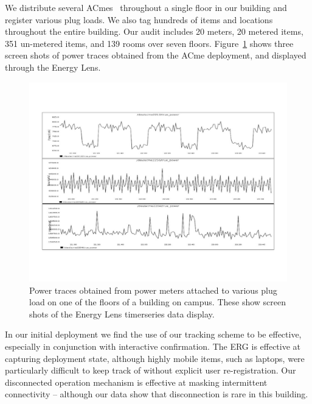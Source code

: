 We distribute several ACmes~\cite{acme} throughout a single floor in our building and register various plug loads.  We also tag
hundreds of items and locations throughout the entire building.  Our audit includes 20 meters, 20 metered items, 351 un-metered items,
 and 139 rooms over seven floors.  Figure~\ref{fig:tsdata} shows three screen shots of power traces obtained from the ACme deployment, and displayed
 through the Energy Lens. 

\begin{figure}[htb!]
\begin{center}
\includegraphics[scale=0.33]{figs/graphs_screen}
\caption{Power traces obtained from power meters attached to various plug load on one of the floors of
a building on campus.  These show screen shots of the Energy Lens timerseries data display.}
\label{fig:tsdata}
\end{center}
\end{figure}

In our initial deployment we find the use of our tracking scheme to be effective, especially in conjunction with
interactive confirmation.  The ERG is effective at capturing deployment state, although highly mobile items, such as laptops,
were particularly difficult to keep track of without explicit user re-registration.  Our disconnected operation mechanism is 
effective at masking 
intermittent connectivity -- although our data show that disconnection is rare in this building.  

